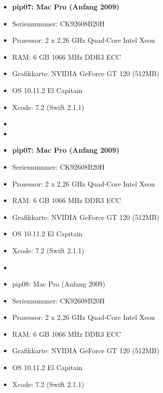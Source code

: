 \begin{itemize}
\item[]\textbf{pip07: Mac Pro (Anfang 2009)}
\item[] Seriennummer: CK92608B20H
\item[]Prozessor: 	2 x 2,26 GHz Quad-Core Intel Xeon 
\item[]RAM: 		6 GB 1066 MHz DDR3 ECC
\item[]Grafikkarte: 	NVIDIA GeForce GT 120 (512MB)
	\item[] OS 10.11.2 El Capitain
\item[]Xcode: 		7.2 (Swift 2.1.1) 
\item[]
	\item[] 
\item[]\textbf{pip07: Mac Pro (Anfang 2009)}
\item[] Seriennummer: CK92608B20H
\item[]Prozessor: 	2 x 2,26 GHz Quad-Core Intel Xeon 
\item[]RAM: 		6 GB 1066 MHz DDR3 ECC
\item[]Grafikkarte: 	NVIDIA GeForce GT 120 (512MB)
	\item[] OS 10.11.2 El Capitain
\item[]Xcode: 		7.2 (Swift 2.1.1) 
	\item[] 
	\item[] pip08: Mac Pro (Anfang 2009)
	\item[] Seriennummer: CK92608B20H
	\item[] Prozessor: 	2 x 2,26 GHz Quad-Core Intel Xeon 
	\item[] RAM: 		6 GB 1066 MHz DDR3 ECC
	\item[] Grafikkarte: 	NVIDIA GeForce GT 120 (512MB)
	\item[] OS 10.11.2 El Capitain
	\item[] Xcode: 		7.2 (Swift 2.1.1)



\end{itemize}
